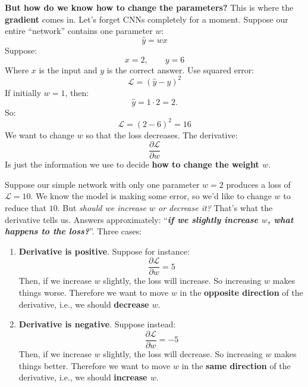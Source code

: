 \begin{remarkbox}
    \highspace
    \textcolor{Green3}{ \textbf{But how do we know how to change the parameters?}} This is where the \textbf{gradient} comes in.
    Let's forget CNNs completely for a moment.
    Suppose our entire ``network'' contains one parameter $w$:
    \begin{equation*}
        \hat{y} = wx
    \end{equation*}
    Suppose:
    \begin{equation*}
        x=2,\qquad y=6
    \end{equation*}
    Where $x$ is the input and $y$ is the correct answer. Use squared error:
    \begin{equation*}
        \mathcal{L} = \left( \hat{y} - y \right)^{2}
    \end{equation*}
    If initially $w=1$, then:
    \begin{equation*}
        \hat{y}=1\cdot2=2.
    \end{equation*}
    So:
    \begin{equation*}
        \mathcal{L}=(2-6)^2=16
    \end{equation*}
    We want to change $w$ so that the loss decreases.
    The derivative:
    \begin{equation*}
        \frac{\partial\mathcal{L}}{\partial w}
    \end{equation*}
    Is just the information we use to decide \textbf{how to change the weight $w$}.

    \highspace
    Suppose our simple network with only one parameter $w = 2$ produces a loss of $\mathcal{L} = 10$. We know the model is making some error, so we'd like to change $w$ to reduce that $10$. But \emph{should we increase $w$ or decrease it?} That's what the derivative tells us. Answers approximately: ``\emph{\textbf{if we slightly increase $w$, what happens to the loss?}}''. Three cases:
    \begin{enumerate}
        \item \textbf{Derivative is positive}. Suppose for instance:
            \begin{equation*}
                \frac{\partial\mathcal{L}}{\partial w} = 5
            \end{equation*}
            Then, if we increase $w$ slightly, the loss will increase. So increasing $w$ makes things worse. Therefore we want to move $w$ in the \textbf{opposite direction} of the derivative, i.e., we should \textbf{decrease $w$}.

        \item \textbf{Derivative is negative}. Suppose instead:
            \begin{equation*}
                \frac{\partial\mathcal{L}}{\partial w} = -5
            \end{equation*}
            Then, if we increase $w$ slightly, the loss will decrease. So increasing $w$ makes things better. Therefore we want to move $w$ in the \textbf{same direction} of the derivative, i.e., we should \textbf{increase $w$}.


\end{enumerate}
\end{remarkbox}
